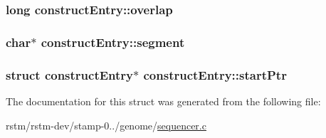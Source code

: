 \hypertarget{structconstructEntry_a709851c75b4302d62e9438ec88a0603c}{
\subsubsection[{overlap}]{\setlength{\rightskip}{0pt plus 5cm}long construct\-Entry\-::overlap}}\label{structconstructEntry_a709851c75b4302d62e9438ec88a0603c}
\hypertarget{structconstructEntry_aab22682576220f3efee928a9fac21ad4}{
\subsubsection[{segment}]{\setlength{\rightskip}{0pt plus 5cm}char$\ast$ construct\-Entry\-::segment}}\label{structconstructEntry_aab22682576220f3efee928a9fac21ad4}
\hypertarget{structconstructEntry_a9d822529ef8a6b557ea42d986906d496}{
\subsubsection[{start\-Ptr}]{\setlength{\rightskip}{0pt plus 5cm}struct {\bf construct\-Entry}$\ast$ construct\-Entry\-::start\-Ptr}}\label{structconstructEntry_a9d822529ef8a6b557ea42d986906d496}


The documentation for this struct was generated from the following file\-:\begin{DoxyCompactItemize}
\item 
rstm/rstm-\/dev/stamp-\/0../genome/\hyperlink{sequencer_8c}{sequencer.\-c}\end{DoxyCompactItemize}
